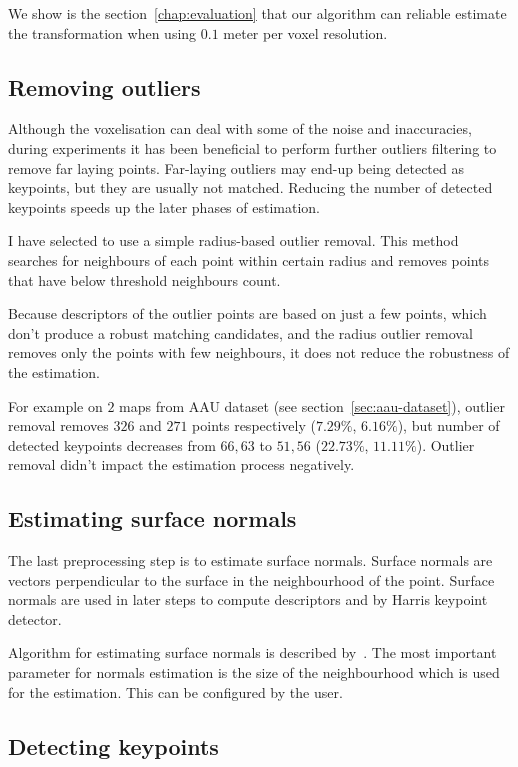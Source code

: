 We show is the section~\ref{chap:evaluation} that our algorithm can reliable estimate the transformation when using $0.1$ meter per voxel resolution.

\subsection{Removing outliers}
\label{sec:outlier-removal}

Although the voxelisation can deal with some of the noise and inaccuracies, during experiments it has been beneficial to perform further outliers filtering to remove far laying points. Far-laying outliers may end-up being detected as keypoints, but they are usually not matched. Reducing the number of detected keypoints speeds up the later phases of estimation.

I have selected to use a simple radius-based outlier removal. This method searches for neighbours of each point within certain radius and removes points that have below threshold neighbours count.

Because descriptors of the outlier points are based on just a few points, which don't produce a robust matching candidates, and the radius outlier removal removes only the points with few neighbours, it does not reduce the robustness of the estimation.

For example on $2$ maps from \gls{AAU} dataset (see section~\ref{sec:aau-dataset}), outlier removal removes $326$ and $271$ points respectively ($7.29\%$, $6.16\%$), but number of detected keypoints decreases from $66, 63$ to $51, 56$ ($22.73\%$, $11.11\%$). Outlier removal didn't impact the estimation process negatively.

\subsection{Estimating surface normals}
\label{sec:normal-estimation}

The last preprocessing step is to estimate surface normals. Surface normals are vectors perpendicular to the surface in the neighbourhood of the point. Surface normals are used in later steps to compute descriptors and by Harris keypoint detector.

Algorithm for estimating surface normals is described by~\citet{RusuDoctoralDissertation}. The most important parameter for normals estimation is the size of the neighbourhood which is used for the estimation. This can be configured by the user.

\subsection{Detecting keypoints}
\label{sec:detect-keypoints}

